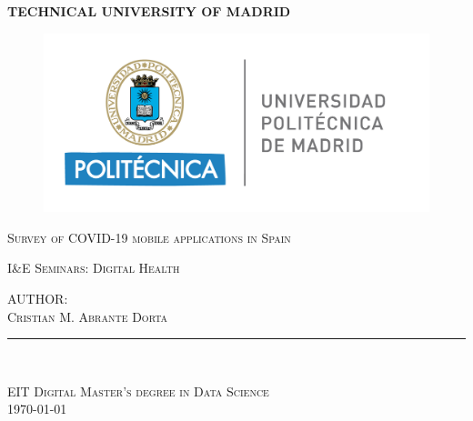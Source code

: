 \begin{titlepage}
\begin{center}
	\vspace{5 mm}
	    \textbf{\Large TECHNICAL UNIVERSITY OF MADRID}
	\par
	\vspace{10 mm}
	\begin{figure}[htb]
	    \centering
	    \includegraphics[scale=0.7]{images/general/uni-logo.png}
	\end{figure}



    \vspace{20 mm}\textsc{\Large Survey of COVID-19 mobile applications in Spain}
    \par
    \vspace{10 mm}\textsc{I\&E Seminars: Digital Health}
    \par
    \vspace{10 mm}
    \textsc{
        AUTHOR: \\
        Cristian M. Abrante Dorta
    }
    \par
	\rule{80mm}{0.1mm}\\
	\vspace{10 mm}
	
    \textsc{EIT Digital Master's degree in Data Science}\\
    \textsc{\today}
\end{center}
\end{titlepage}

